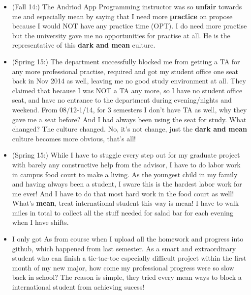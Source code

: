 \documentclass[9pt,b5paper]{article}
\begin{document}
\begin{itemize}
\item (Fall 14:) The Andriod App Programming instructor was so \textbf{unfair} towards me and especially mean by saying that I need more \textbf{practice} on propose because I would NOT have any practice time (OPT). I do need more practise but the university gave me no opportunities for practise at all. He is the representative of this \textbf{dark and mean} culture.
\item (Spring 15:) The department successfully blocked me from getting a TA for any more professional practise, required and got my student office one seat back in Nov 2014 as well, leaving me no good study environment at all. They claimed that because I was NOT a TA any more, so I have no student office seat, and have no entrance to the department during evening/nights and weekend. From 08/12-1/14, for 3 semesters I don't have TA as well, why they gave me a seat before? And I had always been using the seat for study. What changed? The culture changed. No, it's not change, just the \textbf{dark and mean} culture becomes more obvious, that's all!
\item (Spring 15:) While I have to stuggle every step out for my graduate project with barely any constructive help from the advisor, I have to do labor work in campus food court to make a living. As the youngest child in my family and having always been a student, I sware this is the hardest labor work for me ever! And I have to do that most hard work in the food court as well! What's \textbf{mean}, treat international student this way is mean! I have to walk miles in total to collect all the stuff needed for salad bar for each evening when I have shifts.
\item I only got As from course when I upload all the homework and progress into github, which happened from last semester. As a smart and extraordinary student who can finish a tic-tac-toe especially difficult project within the first month of my new major, how come my professional progress were so slow back in school? The reason is simple, they tried every mean ways to block a international student from achieving sucess!
\end{itemize}
\end{document}
